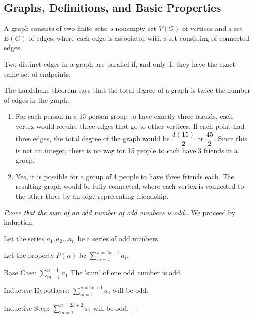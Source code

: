 \documentclass[12pt]{article}
\newenvironment{modenumerate}
  {\enumerate\setupmodenumerate}
  {\endenumerate}
\newif\ifmoditem
\newcommand{\setupmodenumerate}{%
  \global\moditemfalse
  \let\origmakelabel\makelabel
  \def\moditem##1{\global\moditemtrue\def\mesymbol{##1}\item}%
  \def\makelabel##1{%
    \origmakelabel{##1\ifmoditem\rlap{\mesymbol}\fi\enspace}%
    \global\moditemfalse}%
}
\begin{document}

\setcounter{section}{10}
\subsection{Graphs, Definitions, and Basic Properties}

\begin{modenumerate}
\item %
  A graph consists of two finite sets: a nonempty set $V(G)$ of vertices and a set $E(G)$ of edges, where each
  edge is associated with a set consisting of connected edges.  \setcounter{enumi}{2}
\item %
Two distinct edges in a graph are parallel if, and only if, they have the exact same set of endpoints.
\setcounter{enumi}{14}
\item %
The handshake theorem says that the total degree of a graph is twice the number of edges in the graph.
\setcounter{enumi}{26}
\moditem{*} %
\begin{enumerate}
\item 
For each person in a 15 person group to have exactly three friends, each vertex would require three edges that
go to other vertices. If each point had three edges, the total degree of the graph would be $\dfrac{3(15)}{2}$
or $\dfrac{45}{2}$. Since this is not an integer, there is no way for 15 people to each have 3 friends in a
group.
\item Yes, it is possible for a group of 4 people to have three friends each. The resulting graph would be
  fully connected, where each vertex is connected to the other three by an edge representing friendship.
\end{enumerate}

\setcounter{enumi}{30}
\item %
\begin{proof}[Prove that the sum of an odd number of odd numbers is odd.]

We proceed by induction.

Let the series $a_{1},a_{2} \dots a_{n}$ be a series of odd numbers.

Let the property $P(n)$ be $\displaystyle\sum_{m=1}^{n=2k+1}a_{i}$.

Base Case: $\displaystyle\sum_{m=1}^{n=1}a_{1}$ The 'sum' of one odd number is odd.

Inductive Hypothesis: $\displaystyle\sum_{m=1}^{n=2k+1}a_{1}$ will be odd.

Inductive Step: $\displaystyle\sum_{m=1}^{n=2k+2}a_{1}$ will be odd.


\end{proof}
\end{modenumerate}
\end{document}
